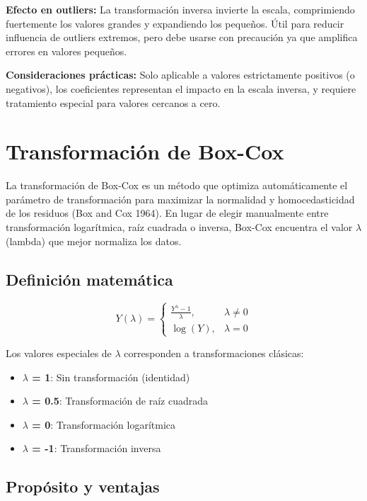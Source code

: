\documentclass[
  letterpaper,
  DIV=11,
  numbers=noendperiod]{scrreprt}
\providecommand{\tightlist}{%
  \setlength{\itemsep}{0pt}\setlength{\parskip}{0pt}}
\begin{document}
\textbf{Efecto en outliers:} La transformación inversa invierte la
escala, comprimiendo fuertemente los valores grandes y expandiendo los
pequeños. Útil para reducir influencia de outliers extremos, pero debe
usarse con precaución ya que amplifica errores en valores pequeños.

\textbf{Consideraciones prácticas:} Solo aplicable a valores
estrictamente positivos (o negativos), los coeficientes representan el
impacto en la escala inversa, y requiere tratamiento especial para
valores cercanos a cero.

\section{Transformación de Box-Cox}\label{transformaciuxf3n-de-box-cox}

La transformación de Box-Cox es un método que optimiza automáticamente
el parámetro de transformación para maximizar la normalidad y
homocedasticidad de los residuos (Box and Cox 1964). En lugar de elegir
manualmente entre transformación logarítmica, raíz cuadrada o inversa,
Box-Cox encuentra el valor \(\lambda\) (lambda) que mejor normaliza los
datos.

\subsection{Definición matemática}\label{definiciuxf3n-matemuxe1tica}

\[Y(\lambda) = \begin{cases}
\frac{Y^\lambda - 1}{\lambda}, & \lambda \neq 0 \\
\log(Y), & \lambda = 0
\end{cases}\]

Los valores especiales de \(\lambda\) corresponden a transformaciones
clásicas:

\begin{itemize}
\tightlist
\item
  \textbf{\(\lambda\) = 1}: Sin transformación (identidad)
\item
  \textbf{\(\lambda\) = 0.5}: Transformación de raíz cuadrada\\
\item
  \textbf{\(\lambda\) = 0}: Transformación logarítmica
\item
  \textbf{\(\lambda\) = -1}: Transformación inversa
\end{itemize}

\subsection{Propósito y ventajas}\label{propuxf3sito-y-ventajas}
\end{document}
